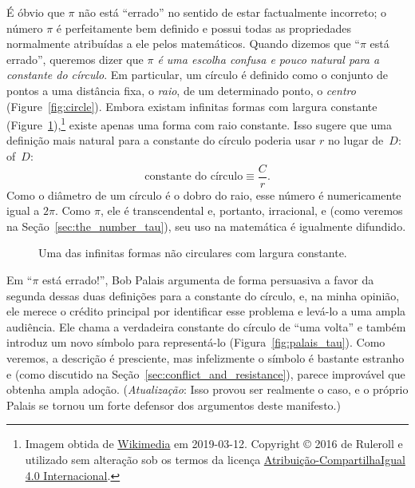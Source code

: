 É óbvio que $\pi$ não está ``errado'' no sentido de estar factualmente incorreto; o número $\pi$ é perfeitamente bem definido e possui todas as propriedades normalmente atribuídas a ele pelos matemáticos. Quando dizemos que ``$\pi$ está errado'', queremos dizer que \emph{$\pi$ é uma escolha confusa e pouco natural para a constante do círculo}. Em particular, um círculo é definido como o conjunto de pontos a uma distância fixa, o \emph{raio}, de um determinado ponto, o \emph{centro} (Figure~\ref{fig:circle}). Embora existam infinitas formas com largura constante (Figure~\ref{fig:constant_width}),\footnote{Imagem obtida de \href{https://commons.wikimedia.org/wiki/File:Reuleaux_triangle_roll.gif}{Wikimedia} em 2019-03-12. Copyright © 2016 de Ruleroll e utilizado sem alteração sob os termos da licença \href{https://creativecommons.org/licenses/by-sa/4.0/deed.pt_BR}{Atribuição-CompartilhaIgual 4.0 Internacional}.} existe apenas uma forma com raio constante. Isso sugere que uma definição mais natural para a constante do círculo poderia usar $r$ no lugar de~$D$:
of~$D$:
\begin{equation}
\label{eq:circle_constant}
\mbox{constante do círculo} \equiv \frac{C}{r}.
\end{equation}
Como o diâmetro de um círculo é o dobro do raio, esse número é numericamente igual a $2\pi$. Como $\pi$, ele é transcendental e, portanto, irracional, e (como veremos na Seção~\ref{sec:the_number_tau}), seu uso na matemática é igualmente difundido.

\begin{figure}
\caption{Uma das infinitas formas não circulares com largura constante.\label{fig:constant_width}}
\end{figure}

Em ``$\pi$ está errado!'', Bob Palais argumenta de forma persuasiva a favor da segunda dessas duas definições para a constante do círculo, e, na minha opinião, ele merece o crédito principal por identificar esse problema e levá-lo a uma ampla audiência. Ele chama a verdadeira constante do círculo de ``uma volta'' e também introduz um novo símbolo para representá-lo (Figura~\ref{fig:palais_tau}). Como veremos, a descrição é presciente, mas infelizmente o símbolo é bastante estranho e (como discutido na Seção~\ref{sec:conflict_and_resistance}), parece improvável que obtenha ampla adoção. (\emph{Atualização}: Isso provou ser realmente o caso, e o próprio Palais se tornou um forte defensor dos argumentos deste manifesto.)

